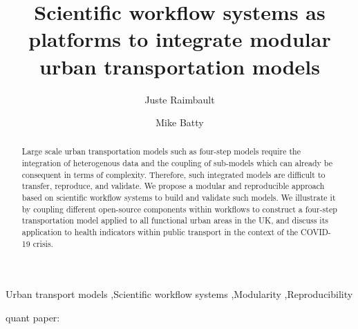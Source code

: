\documentclass[3p,times,procedia]{elsarticle}
\begin{document}
\begin{frontmatter}


\title{Scientific workflow systems as platforms to integrate modular urban transportation models}

\author[a,b,c]{Juste Raimbault}
\author[a]{Mike Batty}

\address[a]{CASA, University College London, London, United Kingdom}
\address[b]{UPS CNRS 3611 Complex Systems Institute, Paris, France}
\address[c]{UMR CNRS 8504 G{\'e}ographie-cit{\'e}s, Paris, France}

\begin{abstract}
Large scale urban transportation models such as four-step models require the integration of heterogenous data and the coupling of sub-models which can already be consequent in terms of complexity. Therefore, such integrated models are difficult to transfer, reproduce, and validate. We propose a modular and reproducible approach based on scientific workflow systems to build and validate such models. We illustrate it by coupling different open-source components within workflows to construct a four-step transportation model applied to all functional urban areas in the UK, and discuss its application to health indicators within public transport in the context of the COVID-19 crisis.
\end{abstract}

\begin{keyword}
Urban transport models \sep Scientific workflow systems \sep Modularity \sep Reproducibility
\end{keyword}
\end{frontmatter}





\cite{cheetham2021determining}

\cite{leung2021real}

\cite{chen2021effects}

quant paper: \cite{batty2021new}

\cite{usher2019software}
\end{document}

